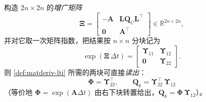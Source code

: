 \begin{theorem}\label{thm:matderiv-vanloan}
构造 $2n\times2n$ 的\emph{增广矩阵}
\begin{equation}
  \boldsymbol{\Xi}=\begin{bmatrix}-\mathbf{A}&\mathbf{L}\mathbf{Q}_C\mathbf{L}^\top\\[2pt]\mathbf{0}&\mathbf{A}^\top\end{bmatrix}\in\mathbb{R}^{2n\times2n},
  \label{eq:matderiv-vanloan-aug}
\end{equation}
并对它取一次矩阵指数，把结果按 $n\times n$ 分块记为
\begin{equation}
  \exp(\boldsymbol{\Xi}\,\Delta t)
  =\begin{bmatrix}\boldsymbol{\Upsilon}_{11}&\boldsymbol{\Upsilon}_{12}\\\mathbf{0}&\boldsymbol{\Upsilon}_{22}\end{bmatrix}.
  \label{eq:matderiv-vanloan-exp}
\end{equation}
则 \cref{def:matderiv-lti} 所需的两块可直接\emph{读出}：
\begin{equation}
  \boxed{\ \boldsymbol{\Phi}=\boldsymbol{\Upsilon}_{22}^\top,\qquad
  \mathbf{Q}_k=\boldsymbol{\Upsilon}_{22}^\top\,\boldsymbol{\Upsilon}_{12}\ }
  \label{eq:matderiv-vanloan-readout}
\end{equation}
（等价地 $\boldsymbol{\Phi}=\exp(\mathbf{A}\Delta t)$ 由右下块转置给出，$\mathbf{Q}_k=\boldsymbol{\Phi}\,\boldsymbol{\Upsilon}_{12}$）。
\end{theorem}
